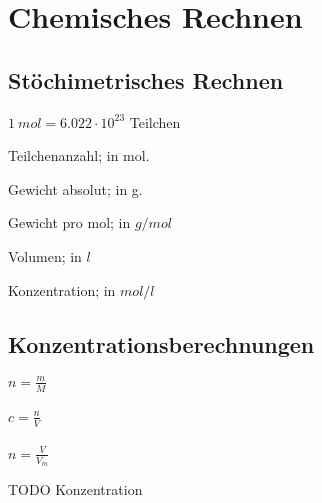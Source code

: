 \section{Chemisches Rechnen}

\subsection{Stöchimetrisches Rechnen}

\begin{definition}[mol]
	$1 \ mol = 6.022 \cdot 10^{23}$ Teilchen
\end{definition}

\begin{definition}[n]
	Teilchenanzahl; in mol.
\end{definition}

\begin{definition}[m]
	Gewicht absolut; in g.
\end{definition}

\begin{definition}[M]
	Gewicht pro mol; in $g/mol$
\end{definition}

\begin{definition}[V]
	Volumen; in $l$
\end{definition}

\begin{definition}[c]
	Konzentration; in $mol/l$
\end{definition}

\subsection{Konzentrationsberechnungen}

\large{
	$n=\frac{m}{M}$
	\\ \\
	$c=\frac{n}{V}$
	\\ \\
	$n = \frac{V}{V_m}$
}


TODO Konzentration